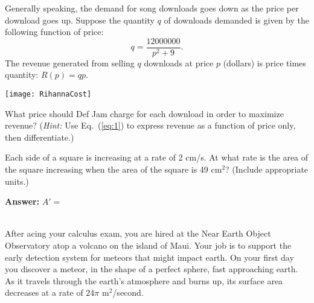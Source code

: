 \documentclass[fleqn,addpoints,12pt]{exam}
\theoremstyle{remark}
\newcommand{\<}{\ensuremath{\langle}}
\renewcommand{\>}{\ensuremath{\rangle}}
\begin{document}
\begin{questions}
\begin{minipage}[t]{0.35\textwidth}
    Generally speaking, the demand for song downloads goes down as 
    the price per download goes up. 
    Suppose the quantity $q$ of downloads demanded is given by the
    following function of price:
    \begin{equation}
      \label{eq:1}
      q = \frac{12000000}{p^2+9}.
    \end{equation}
    The revenue generated from selling $q$ downloads at price $p$
    (dollars) is price times quantity: $R(p) = qp$.
  \end{minipage}
  \begin{minipage}[t]{0.65\textwidth}
    \vskip-4mm
    \begin{center}
      \texttt{[image: RihannaCost]}
    \end{center}
  \end{minipage}

  \bigskip

  What price should Def Jam charge for each download in order to
  maximize revenue? ({\it Hint:} Use Eq.~(\ref{eq:1}) to express 
  revenue as a function of price only, then differentiate.)


  \newpage

  \question
  Each side of a square is increasing at a rate of 2 cm/s. At what rate is
  the area of the square increasing when the area of the square is 49
  $\mathrm{cm}^2$?  (Include appropriate units.)

  \vfill

  \hfill {\bf Answer:} $A'= $ \phantom{XXXXXXXXXXXXXX}\\%
  \phantom{XX} ~ \hfill  \underline{\phantom{XXXXXXXXXXXXXXX}}

  \bigskip

  \newpage
  \question After acing your calculus exam, you are hired at the Near Earth
  Object Observatory atop a volcano on the island of Maui. Your job is to
  support the early detection system for meteors that might impact
  earth.  On your first day you discover a meteor, in the shape
  of a perfect sphere, fast approaching earth.  As it
  travels through the earth's atmosphere and burns up, its surface area
  decreases at a rate of $24 \pi$ $\mbox{m}^2$/second.
  \begin{parts}

\end{parts}
\end{questions}
\end{document}
